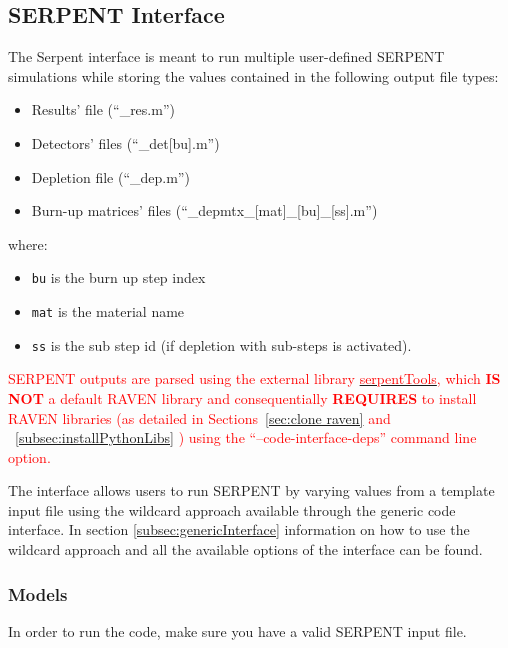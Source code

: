 
\subsection{SERPENT Interface}
\label{subsec:serpentInterface}
The Serpent interface is meant to run multiple user-defined SERPENT simulations
while storing the values contained in the following output file types: 
\begin{itemize}
\item Results' file (``\_res.m'')
\item Detectors' files  (``\_det[bu].m'')
\item Depletion file (``\_dep.m'')
\item Burn-up matrices' files (``\_depmtx\_[mat]\_[bu]\_[ss].m'')
\end{itemize}

where:
\begin{itemize}
\item  \texttt{bu} is the burn up step index
\item  \texttt{mat} is the material name
\item  \texttt{ss} is the sub step id (if depletion with sub-steps is activated).
\end{itemize}

\nb \textcolor{red}{SERPENT outputs are parsed using the external library \href{https://serpent-tools.readthedocs.io/en/master/index.html}{ \textcolor{red}{serpentTools}}, 
                             which \textbf{IS NOT} a default RAVEN library and consequentially \textbf{REQUIRES} to install RAVEN libraries (as detailed in Sections~\ref{sec:clone raven} and ~\ref{subsec:installPythonLibs} )
                             using the ``--code-interface-deps'' command line option.} 


The interface allows users to run SERPENT by varying values from a 
template input file using the wildcard approach available through the
generic code interface. In section \ref{subsec:genericInterface}  information
on how to use the wildcard approach and all the available options of the interface
can be found.

\subsubsection{Models}
\label{subsubsec:serpentInterfaceModels}
In order to run the code, make sure you have a valid SERPENT input file.

